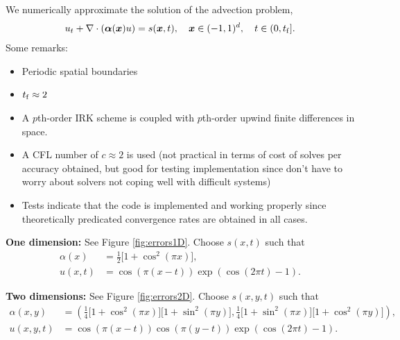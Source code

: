 \documentclass[review]{siamart}
\begin{document}
We numerically approximate the solution of the advection problem,
\begin{align}
u_t  + \nabla \cdot (\bm{\alpha}(\bm{x}) u) = s(\bm{x},t), \quad  \bm{x} \in (-1, 1)^d, \quad t \in (0, t_{\rm f}].
\end{align}
Some remarks:
\begin{itemize}
\item Periodic spatial boundaries

\item $t_{\rm f} \approx 2$

\item A $p$th-order IRK scheme is coupled with $p$th-order upwind finite differences in space.

\item A CFL number of $c \approx 2$ is used (not practical in terms of cost of solves per accuracy obtained, but good for testing implementation since don't have to worry about solvers not coping well with difficult systems)

\item Tests indicate that the code is implemented and working properly since theoretically predicated convergence rates are obtained in all cases.
\end{itemize}

\textbf{One dimension:} See Figure \ref{fig:errors1D}. Choose $s(x,t)$ such that
\begin{align}
\alpha(x) &= \tfrac{1}{2} \big[1 + \cos^2(\pi x) \big],
\\
u(x,t) &= \cos(\pi(x - t)) \exp(\cos(2\pi t) - 1).
\end{align}

\textbf{Two dimensions:} See Figure \ref{fig:errors2D}. Choose $s(x,y,t)$ such that
\begin{align}
\alpha(x,y) &= \left(
\tfrac{1}{4} \big[1 + \cos^2(\pi x) \big] \big[ 1 + \sin^2(\pi y) \big],
\tfrac{1}{4} \big[1 + \sin^2(\pi x) \big] \big[1 + \cos^2(\pi y) \big] 
\right), 
\\
u(x,y,t) &= \cos(\pi(x - t)) \cos(\pi(y - t)) \exp(\cos(2\pi t) - 1).
\end{align}
\end{document}
